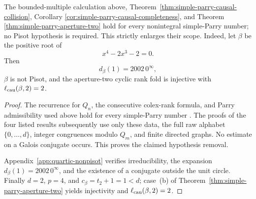 \begin{proposition}
\label{prop:nonpisot-simple-parry-scope}
The bounded-multiple calculation above,
Theorem~\ref{thm:simple-parry-causal-collision}, Corollary
\ref{cor:simple-parry-causal-completeness}, and Theorem
\ref{thm:simple-parry-aperture-two} hold for every nonintegral simple-Parry
number; no Pisot hypothesis is required.  This strictly enlarges their scope.
Indeed, let $\beta$ be the positive root of
\begin{equation}
x^4-2x^3-2=0.
\label{eq:nonpisot-simple-parry-witness}
\end{equation}
Then
\[
d_\beta(1)=2002\,0^\infty,
\]
$\beta$ is not Pisot, and the aperture-two cyclic rank fold is injective with
$\ell_{\rm cau}(\beta,2)=2$.
\end{proposition}

\begin{proof}
The recurrence for $Q_n$, the consecutive colex-rank formula, and Parry
admissibility used above hold for every simple-Parry number
\cite{Parry1960,CharlierCisterninoStipulanti2022}.  The proofs of the four
listed results subsequently use only these data, the full raw alphabet
$\{0,\ldots,d\}$, integer congruences modulo $Q_m$, and finite directed
graphs.  No estimate on a Galois conjugate occurs.  This proves the claimed
hypothesis removal.

Appendix~\ref{app:quartic-nonpisot} verifies irreducibility, the expansion
$d_\beta(1)=2002\,0^\infty$, and the existence of a conjugate outside the
unit circle.  Finally $d=2$, $p=4$, and
$c_\beta=t_2+1=1<d$; case~\textup{(b)} of
Theorem~\ref{thm:simple-parry-aperture-two} yields injectivity and
$\ell_{\rm cau}(\beta,2)=2$.
\end{proof}


